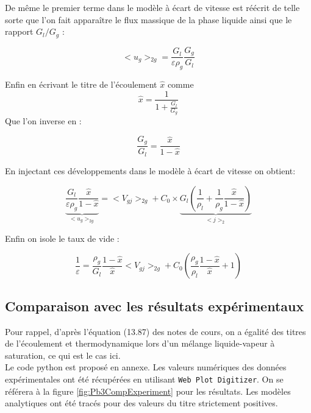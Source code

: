 De même le premier terme dans le modèle à écart de vitesse est réécrit de telle sorte que l'on fait apparaître le flux massique de la phase liquide ainsi que le rapport $G_l/G_g$ :

\begin{equation}
    <u_g>_{2g} = \frac{G_l}{\varepsilon \rho_g}\frac{G_g}{G_l}
\end{equation}


Enfin en écrivant le titre de l'écoulement $\hat{x}$ comme 
\begin{equation}
    \hat{x} = \frac{1}{1 + \frac{G_l}{G_g}}
\end{equation}
Que l'on inverse en :

\begin{equation}
    \frac{G_g}{G_l} = \frac{\hat{x}}{1 - \hat{x}}
\end{equation}

En injectant ces développements dans le modèle à écart de vitesse on obtient:

\begin{equation}
    \underbrace{\frac{G_l}{\varepsilon \rho_g} \frac{\hat{x}}{1 - \hat{x}}}_{<u_g>_{2g}} = <V_{gj}>_{2g} + C_0 \times \underbrace{G_l \left( \frac{1}{\rho_l} + \frac{1}{\rho_g} \frac{\hat{x}}{1 - \hat{x}}\right)}_{<j>_2}
\end{equation}

Enfin on isole le taux de vide : 

\begin{equation}
\boxed{
    \frac{1}{\varepsilon} = \frac{\rho_g}{G_l} \frac{1 - \hat{x}}{\hat{x}}<V_{gj}>_{2g} + C_0\left( \frac{\rho_g}{\rho_l}\frac{1-\hat{x}}{\hat{x}} + 1\right) 
    }
\end{equation}

\subsection{Comparaison avec les résultats expérimentaux}

Pour rappel, d'après l'équation (13.87) des notes de cours, on a égalité des titres de l'écoulement et thermodynamique lors d'un mélange liquide-vapeur à saturation, ce qui est le cas ici. \\

Le code python est proposé en annexe. Les valeurs numériques des données expérimentales ont été récupérées en utilisant \verb|Web Plot Digitizer|. On se référera à la figure \ref{fig:Pb3CompExperiment} pour les résultats. Les modèles analytiques ont été tracés pour des valeurs du titre strictement positives. \\

